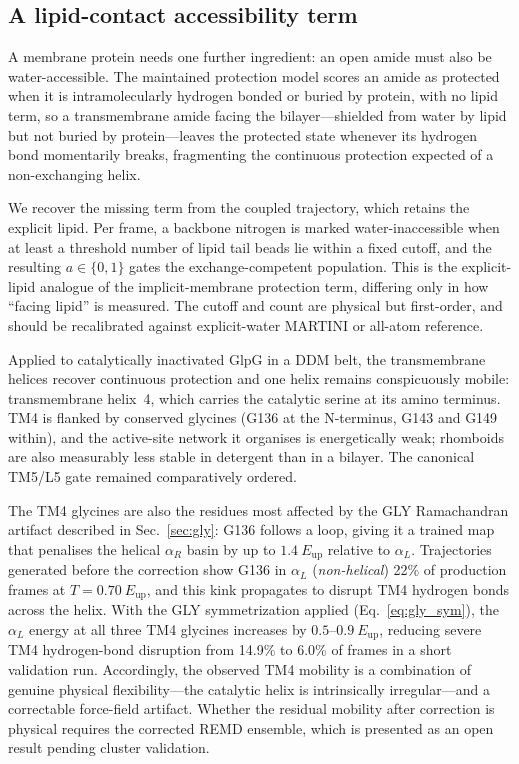 \documentclass[journal=jctcce,manuscript=article,layout=twocolumn]{achemso}
\begin{document}
\subsection{A lipid-contact accessibility term}
\label{sec:hdx-access}

A membrane protein needs one further ingredient: an open amide must also be
water-accessible. The maintained protection model scores an amide as protected when
it is intramolecularly hydrogen bonded or buried by protein, with no lipid term, so a
transmembrane amide facing the bilayer---shielded from water by lipid but not buried
by protein---leaves the protected state whenever its hydrogen bond momentarily
breaks, fragmenting the continuous protection expected of a non-exchanging helix.

We recover the missing term from the coupled trajectory, which retains the explicit
lipid. Per frame, a backbone nitrogen is marked water-inaccessible when at least a
threshold number of lipid tail beads lie within a fixed cutoff, and the resulting
$a\in\{0,1\}$ gates the exchange-competent population. This is the explicit-lipid
analogue of the implicit-membrane protection term, differing only in how ``facing
lipid'' is measured. The cutoff and count are physical but first-order, and should be
recalibrated against explicit-water MARTINI or all-atom reference.

Applied to catalytically inactivated GlpG in a DDM belt, the transmembrane helices
recover continuous protection and one helix remains conspicuously mobile:
transmembrane helix~4, which carries the catalytic serine at its amino terminus. TM4
is flanked by conserved glycines\cite{Wang2006,BenShem2007} (G136 at the N-terminus,
G143 and G149 within), and the active-site network it organises is energetically
weak;\cite{Gaffney2019} rhomboids are also measurably less stable in detergent than
in a bilayer.\cite{Barniol2018,Sawczyc2024} The canonical TM5/L5
gate\cite{Shi2019,Bohg2023} remained comparatively ordered.

The TM4 glycines are also the residues most affected by the GLY Ramachandran artifact
described in Sec.~\ref{sec:gly}: G136 follows a loop, giving it a trained map that
penalises the helical $\alpha_R$ basin by up to $1.4~E_\mathrm{up}$ relative to
$\alpha_L$. Trajectories generated before the correction show G136 in $\alpha_L$
(\emph{non-helical}) 22\% of production frames at $T=0.70~E_\mathrm{up}$, and this
kink propagates to disrupt TM4 hydrogen bonds across the helix. With the GLY
symmetrization applied (Eq.~\ref{eq:gly_sym}), the $\alpha_L$ energy at all three
TM4 glycines increases by $0.5$--$0.9~E_\mathrm{up}$, reducing severe TM4
hydrogen-bond disruption from 14.9\% to 6.0\% of frames in a short validation run.
Accordingly, the observed TM4 mobility is a combination of genuine physical
flexibility---the catalytic helix is intrinsically irregular---and a correctable
force-field artifact. Whether the residual mobility after correction is physical
requires the corrected REMD ensemble, which is presented as an open result pending
cluster validation.
\end{document}
